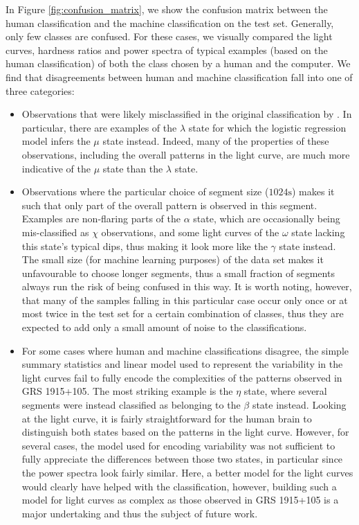 \documentclass[12pt]{emulateapj}
\begin{document}
In Figure \ref{fig:confusion_matrix}, we show the confusion matrix between the human classification and the machine classification on the 
test set. Generally, only few classes are confused. For these cases, we visually compared the light curves, hardness ratios and power spectra of 
typical examples (based on the human classification) of both the class chosen by a human and the computer. We find that disagreements between 
human and machine classification fall into one of three categories:
\begin{itemize}
\item{Observations that were likely misclassified in the original classification by \citet{belloni2000}. In particular, there are examples of the 
$\lambda$ state for which the logistic regression model infers the $\mu$ state instead. Indeed, many of the properties of these observations, including 
the overall patterns in the light curve, are much more indicative of the $\mu$ state than the $\lambda$ state.}
\item{Observations where the particular choice of segment size ($1024\mathrm{s}$) makes it such that only part of the overall pattern is observed in this 
segment. Examples are non-flaring parts of the $\alpha$ state, which are occasionally being mis-classified as $\chi$ observations, and some light 
curves of the $\omega$ state lacking this state's typical dips, thus making it look more like the $\gamma$ state instead. The small size (for machine 
learning purposes) of the data set makes it unfavourable to choose longer segments, thus a small fraction of segments always run the risk of being 
confused in this way. It is worth noting, however, that many of the samples falling in this particular case occur only once or at most twice in the 
test set for a certain combination of classes, thus they are expected to add only a small amount of noise to the classifications.}
\item{For some cases where human and machine classifications disagree, the simple summary statistics and linear model used to represent the variability
 in the light curves fail to fully encode the complexities of the patterns observed in GRS 1915+105. The most striking example is the $\eta$ state, where several 
 segments were instead classified as belonging to the $\beta$ state instead. Looking at the light curve, it is fairly straightforward for the human brain to distinguish 
 both states based on the patterns in the light curve. However, for several cases, the model used for encoding variability was not sufficient to fully appreciate the differences between those two states, in particular since the power spectra look fairly similar. Here, a better model for the light curves would clearly have helped with the classification, however, building such a model for light curves as complex as those observed in GRS 1915+105 is a major undertaking and thus the subject of future work.}
\end{itemize}
\end{document}
